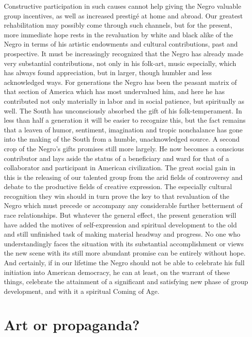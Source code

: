 \documentclass[12pt]{article}
\begin{document}
Constructive participation in such causes cannot help giving the Negro valuable group incentives, as well as increased prestigé at home and abroad. Our greatest rehabilitation may possibly come through such channels, but for the present, more immediate hope rests in the revaluation by white and black alike of the Negro in terms of his artistic endowments and cultural contributions, past and prospective. It must be increasingly recognized that the Negro has already made very substantial contributions, not only in his folk-art, music especially, which has always found appreciation, but in larger, though humbler and less acknowledged ways. For generations the Negro has been the peasant matrix of that section of America which has most undervalued him, and here he has contributed not only materially in labor and in social patience, but spiritually as well. The South has unconsciously absorbed the gift of his folk-temperament. In less than half a generation it will be easier to recognize this, but the fact remains that a leaven of humor, sentiment, imagination and tropic nonchalance has gone into the making of the South from a humble, unacknowledged source. A second crop of the Negro's gifts promises still more largely. He now becomes a conscious contributor and lays aside the status of a beneficiary and ward for that of a collaborator and participant in American civilization. The great social gain in this is the releasing of our talented group from the arid fields of controversy and debate to the productive fields of creative expression. The especially cultural recognition they win should in turn prove the key to that revaluation of the Negro which must precede or accompany any considerable further betterment of race relationships. But whatever the general effect, the present generation will have added the motives of self-expression and spiritual development to the old and still unfinished task of making material headway and progress. No one who understandingly faces the situation with its substantial accomplishment or views the new scene with its still more abundant promise can be entirely without hope. And certainly, if in our lifetime the Negro should not be able to celebrate his full initiation into American democracy, he can at least, on the warrant of these things, celebrate the attainment of a significant and satisfying new phase of group development, and with it a spiritual Coming of Age.

\section*{Art or propaganda?}
\end{document}
